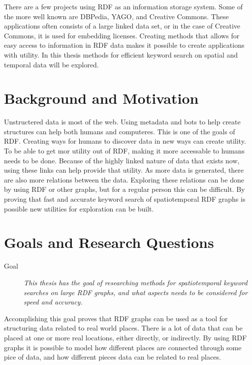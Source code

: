 There are a few projects using RDF as an information storage system. Some of the more well known are DBPedia\cite{dbpedia}, YAGO\cite{yago}, and Creative Commons. These applications often consists of a large linked data set, or in the case of Creative Commons, it is used for embedding licenses. Creating methods that allows for easy access to information in RDF data makes it possible to create applications with utility. In this thesis methods for efficient keyword search on spatial and temporal data will be explored.

\section{Background and Motivation}
\label{sec:BackgroundAndMotivation}
Unstructered data is most of the web. Using metadata and bots to help create structures can help both humans and computeres. This is one of the goals of RDF. Creating ways for humans to discover data in new ways can create utility. To be able to get mor utility out of RDF, making it more accessable to humans needs to be done. Because of the highly linked nature of data that exists now, using these links can help provide that utility. As more data is generated, there are also more relations between the data. Exploring these relations can be done by using RDF or other graphs, but for a regular person this can be difficult. By proving that fast and accurate keyword search of spatiotemporal RDF graphs is possible new utilities for exploration can be built.

\section{Goals and Research Questions}
\label{sec:Goals and Research Questions}
\begin{description}
    \item[Goal] {\em This thesis has the goal of researching methods for spatiotemporal keyword searches on large RDF graphs, and what aspects needs to be considered for speed and accuracy.}
\end{description}
Accomplishing this goal proves that RDF graphs can be used as a tool for structuring data related to real world places. There is a lot of data that can be placed at one or more real locations, either directly, or indirectly. By using RDF graphs it is possible to model how different places are connected through some pice of data, and how different pieces data can be related to real places.

